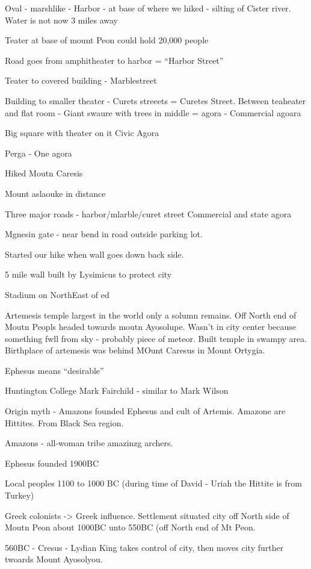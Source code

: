 \documentclass[
]{book}
\begin{document}
Oval - marshlike - Harbor - at base of where we hiked - silting of Cister river. Water is not now 3 miles away

Teater at base of mount Peon could hold 20,000 people

Road goes from amphitheater to harbor = ``Harbor Street''

Teater to covered building - Marblestreet

Building to smaller theater - Curets streeets = Curetes Street. Between teaheater and flat room - Giant swaure with trees in middle = agora - Commercial agoara

Big square with theater on it Civic Agora

Perga - One agora

Hiked Moutn Caresis

Mount aslaouke in distance

Three major roads - harbor/mlarble/curet street
Commercial and state agora

Mgnesin gate - near bend in road outside parking lot.

Started our hike when wall goes down back side.

5 mile wall built by Lysimicus to protect city

Stadium on NorthEast of ed

Artemesis temple largest in the world only a solumn remains. Off North end of Moutn Peopls headed towards moutn Ayosolupe. Wasn't in city center because something fwll from sky - probably piece of meteor. Built temple in swampy area. Birthplace of artemesis was behind MOunt Caresus in Mount Ortygia.

Ephesus means ``desirable''

Huntington College Mark Fairchild - similar to Mark Wilson

Origin myth - Amazons founded Ephesus and cult of Artemis. Amazone are Hittites. From Black Sea region.

Amazons - all-woman tribe amazinzg archers.

Ephesus founded 1900BC

Local peoples 1100 to 1000 BC (during time of David - Uriah the Hittite is from Turkey)

Greek colonists -\textgreater{} Greek influence. Settlement situated city off North side of Moutn Peon about 1000BC unto 550BC (off North end of Mt Peon.

560BC - Cresus - Lydian King takes control of city, then moves city further twoards Mount Ayosolyou.
\end{document}
